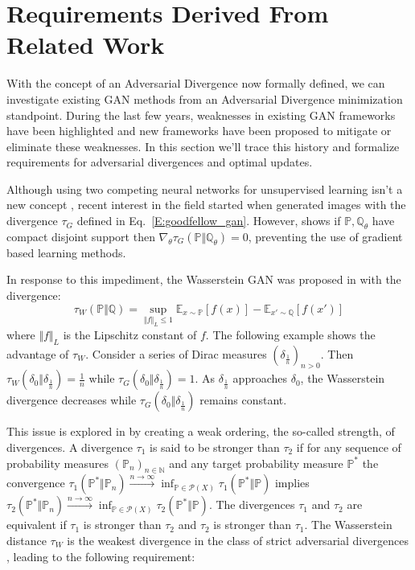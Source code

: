 \documentclass{article}
\begin{document}
\section{Requirements Derived From Related Work}\label{S:related_work}
With the concept of an Adversarial Divergence now formally defined, we can investigate
existing GAN methods from an Adversarial Divergence minimization standpoint.
 During the last few years, weaknesses in existing GAN frameworks have been highlighted and new frameworks have been
 proposed to mitigate or eliminate these weaknesses. In this section we'll trace this history and
 formalize requirements for adversarial divergences and optimal updates.

 Although using two competing neural networks for unsupervised learning isn't a new concept \cite{schmidhuber1992learning},
 recent interest in the field started when \cite{goodfellow2014generative} generated images with the divergence $\tau_G$
 defined in Eq.\ \ref{E:goodfellow_gan}.
 However, \cite{arjovsky2017towards} shows if $\mathbb P,\mathbb Q_\theta$ have compact disjoint support then
 $\nabla_\theta\tau_G(\mathbb P\Vert\mathbb Q_\theta)=0$, preventing the use of gradient based learning methods.

 In response to this impediment, the Wasserstein GAN was proposed in \cite{arjovsky2017wasserstein} with the divergence:
 \[\tau_W(\mathbb P\Vert\mathbb Q)=\sup_{\Vert f\Vert_L\leq 1}\mathbb E_{x\sim\mathbb P}[f(x)]-\mathbb E_{x'\sim\mathbb Q}[f(x')]\]
 where $\Vert f\Vert_L$ is the Lipschitz constant of $f$.
 The following example shows the advantage of $\tau_W$. Consider a series of Dirac measures $(\delta_{\frac{1}{n}})_{n>0}$.
 Then $\tau_W(\delta_0\Vert\delta_{\frac 1 n})=\frac 1 n$ while $\tau_G(\delta_0\Vert\delta_{\frac 1 n})=1$. As $\delta_{\frac 1 n}$ approaches
 $\delta_0$, the Wasserstein divergence decreases while $\tau_G(\delta_0\Vert\delta_{\frac 1 n})$ remains constant.

 This issue is explored in \cite{liu2017approximation} by creating a weak ordering, the so-called strength, of divergences.
 A divergence $\tau_1$ is said to be stronger than $\tau_2$ if for any sequence of probability measures $(\mathbb P_n)_{n\in\mathbb N}$ and
 any target probability measure $\mathbb P^*$ the convergence
 $\tau_1(\mathbb P^*\Vert\mathbb P_n)\overset{n\to\infty}{\longrightarrow}\inf_{\mathbb P\in\mathcal P(X)}\tau_1(\mathbb P^*\Vert\mathbb P)$
 implies $\tau_2(\mathbb P^*\Vert\mathbb P_n)\overset{n\to\infty}{\longrightarrow}\inf_{\mathbb P\in\mathcal P(X)}\tau_2(\mathbb P^*\Vert\mathbb P)$.
 The divergences $\tau_1$ and $\tau_2$ are equivalent if $\tau_1$ is stronger than $\tau_2$ and $\tau_2$ is stronger than $\tau_1$.
 The Wasserstein distance $\tau_W$ is the weakest divergence in the class of strict adversarial divergences \cite{liu2017approximation},
 leading to the following requirement:
\end{document}
